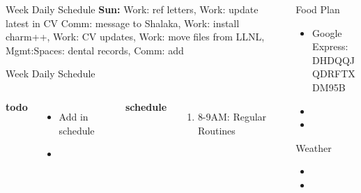 \documentclass[serif, mathserif, final]{beamer}
\begin{document}
\begin{frame}
\begin{columns}
\begin{column}{0.5\linewidth}
  \begin{block}{Week Daily Schedule} 
    {\bf Sun:} Work: ref letters,  Work: update latest in CV  Comm: message to Shalaka, 
     Work: install charm++, Work: CV updates,
    Work: move files from LLNL, Mgmt:Spaces: dental records,  Comm: add 
  \end{block}
      
  \begin{block}{Week Daily Schedule} 
    \begin{columns}
      \textbf{\small todo} \\ 
      \begin{itemize}
        \tiny \item \tiny Add in schedule
      \item \tiny 
      \end{itemize} 
      \textbf{\small schedule} \\
      \begin{enumerate} 
        \tiny \item \tiny 8-9AM: Regular Routines 
      \end{enumerate} 
    \end{columns} 
  \end{block} 
\end{column}

\begin{column}{0.25\linewidth}
  
  \begin{block}{Food Plan} 
    \begin{itemize}
      \tiny \item \tiny Google Express: DHDQQJQDRFTXDM95B
    \item \tiny 
    \item \tiny 
    \end{itemize}
  \end{block} 
  
  \begin{block}{Weather}
    \begin{itemize}
      \tiny \item \tiny 
    \item \tiny
    \end{itemize}
  \end{block}
  

\end{column}
\end{columns}
\end{frame}
\end{document}

